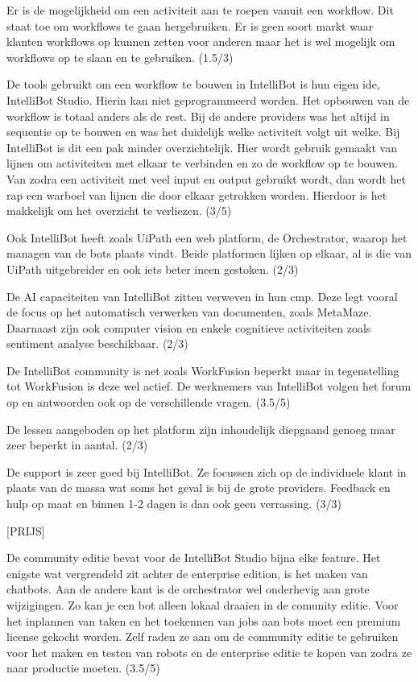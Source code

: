 Er is de mogelijkheid om een activiteit aan te roepen vanuit een workflow. Dit staat toe om workflows te gaan hergebruiken. Er is geen soort markt waar klanten workflows op kunnen zetten voor anderen maar het is wel mogelijk om workflows op te slaan en te gebruiken. (1.5/3)

De tools gebruikt om een workflow te bouwen in IntelliBot is hun eigen ide, IntelliBot Studio. Hierin kan niet geprogrammeerd worden. Het opbouwen van de workflow is totaal anders als de rest. Bij de andere providers was het altijd in sequentie op te bouwen en was het duidelijk welke activiteit volgt uit welke. Bij IntelliBot is dit een pak minder overzichtelijk. Hier wordt gebruik gemaakt van lijnen om activiteiten met elkaar te verbinden en zo de workflow op te bouwen. Van zodra een activiteit met veel input en output gebruikt wordt, dan wordt het rap een warboel van lijnen die door elkaar getrokken worden. Hierdoor is het makkelijk om het overzicht te verliezen. (3/5)

Ook IntelliBot heeft zoals UiPath een web platform, de Orchestrator, waarop het managen van de bots plaats vindt. Beide platformen lijken op elkaar, al is die van UiPath uitgebreider en ook iets beter ineen gestoken. (2/3)

De AI capaciteiten van IntelliBot zitten verweven in hun \acrfull{cmp}. Deze legt vooral de focus op het automatisch verwerken van documenten, zoals MetaMaze. Daarnaast zijn ook computer vision en enkele cognitieve activiteiten zoals sentiment analyse beschikbaar. (2/3)

De IntelliBot community is net zoals WorkFusion beperkt maar in tegenstelling tot WorkFusion is deze wel actief. De werknemers van IntelliBot volgen het forum op en antwoorden ook op de verschillende vragen. (3.5/5)

De lessen aangeboden op het platform zijn inhoudelijk diepgaand genoeg maar zeer beperkt in aantal. (2/3)

De support is zeer goed bij IntelliBot. Ze focussen zich op de individuele klant in plaats van de massa wat soms het geval is bij de grote providers. Feedback en hulp op maat en binnen 1-2 dagen is dan ook geen verrassing. (3/3)

[PRIJS]

De community editie bevat voor de IntelliBot Studio bijna elke feature. Het enigste wat vergrendeld zit achter de enterprise edition, is het maken van chatbots. Aan de andere kant is de orchestrator wel onderhevig aan grote wijzigingen. Zo kan je een bot alleen lokaal draaien in de comunity editie. Voor het inplannen van taken en het toekennen van jobs aan bots moet een premium license gekocht worden. Zelf raden ze aan om de community editie te gebruiken voor het maken en testen van robots en de enterprise editie te kopen van zodra ze naar productie moeten. (3.5/5) 

